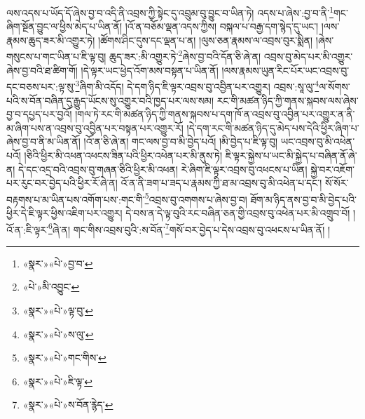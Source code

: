 ལས་འདས་པ་ཡོད་དོ་ཞེས་བྱ་བ་འདི་ནི་འབྲས་ཀྱི་སྟེང་དུ་འབྲུམ་བུ་བྱུང་བ་ཡིན་ཏེ། འདས་པ་ཞེས་:བྱ་བ་ནི་\footnote{«སྣར་»«པེ་»བྱ་བ་}གང་ཞིག་སྔོན་བྱུང་ལ་ཕྱིས་མེད་པ་ཡིན་ནོ། །འོ་ན་བཅོམ་ལྡན་འདས་ཀྱིས། བསྐལ་པ་བརྒྱ་དག་སྙེད་དུ་ཡང་། །ལས་རྣམས་ཆུད་ཟར་མི་འགྱུར་ཏེ། །ཚོགས་ཤིང་དུས་དང་ལྡན་པ་ན། །ལུས་ཅན་རྣམས་ལ་འབྲས་བུར་སྨིན། །ཞེས་གསུངས་པ་གང་ཡིན་པ་ཇི་ལྟ་བུ། ཆུད་ཟར་:མི་འགྱུར་ཏེ་\footnote{«པེ་»མི་འབྱུང་}ཞེས་བྱ་བའི་དོན་ཅི་ཞེ་ན། འབྲས་བུ་མེད་པར་མི་འགྱུར་ཞེས་བྱ་བའི་ཐ་ཚིག་གོ། །དེ་ལྟར་ཡང་ཕྱེད་འོག་མས་བསྟན་པ་ཡིན་ནོ། །ལས་རྣམས་ཡུན་རིང་པོར་ཡང་འབྲས་བུ་དང་བཅས་པར་:ལྟ་སུ་\footnote{«སྣར་»«པེ་»ལྟ་བུ་}ཞིག་མི་འདོད། དེ་དག་ཉིད་ཇི་ལྟར་འབྲས་བུ་འབྱིན་པར་འགྱུར། འབྲས་:སཱ་ལུ་\footnote{«སྣར་»«པེ་»ས་ལུ་}ལ་སོགས་པའི་ས་བོན་བཞིན་དུ་རྒྱུད་ཡོངས་སུ་འགྱུར་བའི་ཁྱད་པར་ལས་སམ། རང་གི་མཚན་ཉིད་ཀྱི་གནས་སྐབས་ལས་ཞེས་བྱ་བ་དཔྱད་པར་བྱའོ། །གལ་ཏེ་རང་གི་མཚན་ཉིད་ཀྱི་གནས་སྐབས་པ་དག་ཁོ་ན་འབྲས་བུ་འབྱིན་པར་འགྱུར་ན་ནི་མ་ཞིག་པས་ན་འབྲས་བུ་འབྱིན་པར་བསྟན་པར་འགྱུར་རོ། །དེ་དག་རང་གི་མཚན་ཉིད་དུ་མེད་པས་དེའི་ཕྱིར་ཞིག་པ་ཞེས་བྱ་བ་ནི་མ་ཡིན་ནོ། །འོ་ན་ཅི་ཞེ་ན། གང་ལས་བྱ་བ་མི་བྱེད་པའོ། །མི་བྱེད་པ་ཇི་ལྟ་བུ། ཡང་འབྲས་བུ་མི་འཕེན་པའོ། །ཅིའི་ཕྱིར་མི་འཕན་འཕངས་ཟིན་པའི་ཕྱིར་འཕེན་པར་མི་ནུས་ཏེ། ཇི་ལྟར་སྐྱེས་པ་ཡང་མི་སྐྱེད་པ་བཞིན་ནོ་ཞེ་ན། དེ་དང་འདྲ་བའི་འབྲས་བུ་གཞན་ཅིའི་ཕྱིར་མི་འཕན། རེ་ཞིག་ཇི་ལྟར་འབྲས་བུ་འཕངས་པ་ཡིན། སྐྱེ་བར་འཇོག་པར་རུང་བར་བྱེད་པའི་ཕྱིར་རོ་ཞེ་ན། འོ་ན་ནི་ཟག་པ་ཟད་པ་རྣམས་ཀྱི་ཐ་མ་འབྲས་བུ་མི་འཕེན་པ་དང་། སོ་སོར་བརྟགས་པ་མ་ཡིན་པས་འགོག་པས་:གང་གི་\footnote{«སྣར་»«པེ་»གང་གིས་}འབྲས་བུ་འགགས་པ་ཞེས་བྱ་བ། ཐོག་མ་ཉིད་ནས་བྱ་བ་མི་བྱེད་པའི་ཕྱིར་དེ་ཇི་ལྟར་ཕྱིས་འཇིག་པར་འགྱུར། དེ་བས་ན་དེ་ལྟ་བུའི་རང་བཞིན་ཅན་གྱི་འབྲས་བུ་འཕེན་པར་མི་འགྲུབ་བོ། །འོ་ན་:ཇི་ལྟར་\footnote{«སྣར་»«པེ་»ཇི་ལྟ་}ཞེ་ན། གང་གིས་འབྲས་བུའི་:ས་བོན་\footnote{«སྣར་»«པེ་»ས་བོན་རྙེད་}གསོ་བར་བྱེད་པ་དེས་འབྲས་བུ་འཕངས་པ་ཡིན་ནོ། །
